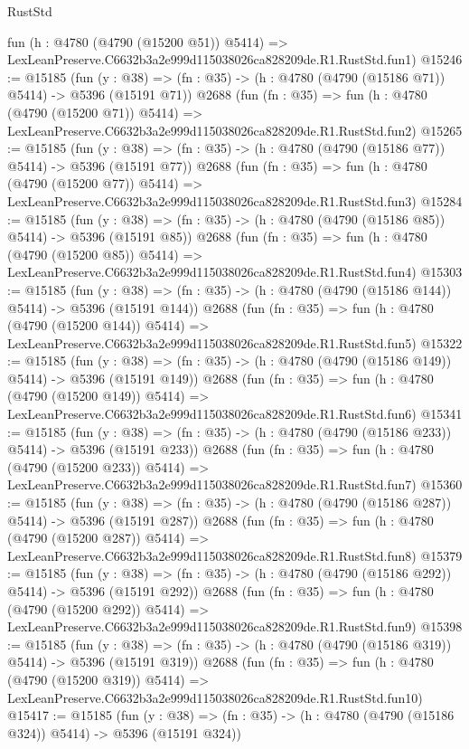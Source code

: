 \begin{lexlean}{RustStd}
\begin{coremodule}
    fun (h : @4780 (@4790 (@15200 @51)) @5414) =>
    LexLeanPreserve.C6632b3a2e999d115038026ca828209de.R1.RustStd.fun1)
@15246 := @15185
    (fun (y : @38) => (fn : @35) -> (h : @4780 (@4790 (@15186 @71)) @5414) -> @5396 (@15191 @71))
    @2688
    (fun (fn : @35) =>
    fun (h : @4780 (@4790 (@15200 @71)) @5414) =>
    LexLeanPreserve.C6632b3a2e999d115038026ca828209de.R1.RustStd.fun2)
@15265 := @15185
    (fun (y : @38) => (fn : @35) -> (h : @4780 (@4790 (@15186 @77)) @5414) -> @5396 (@15191 @77))
    @2688
    (fun (fn : @35) =>
    fun (h : @4780 (@4790 (@15200 @77)) @5414) =>
    LexLeanPreserve.C6632b3a2e999d115038026ca828209de.R1.RustStd.fun3)
@15284 := @15185
    (fun (y : @38) => (fn : @35) -> (h : @4780 (@4790 (@15186 @85)) @5414) -> @5396 (@15191 @85))
    @2688
    (fun (fn : @35) =>
    fun (h : @4780 (@4790 (@15200 @85)) @5414) =>
    LexLeanPreserve.C6632b3a2e999d115038026ca828209de.R1.RustStd.fun4)
@15303 := @15185
    (fun (y : @38) => (fn : @35) -> (h : @4780 (@4790 (@15186 @144)) @5414) -> @5396 (@15191 @144))
    @2688
    (fun (fn : @35) =>
    fun (h : @4780 (@4790 (@15200 @144)) @5414) =>
    LexLeanPreserve.C6632b3a2e999d115038026ca828209de.R1.RustStd.fun5)
@15322 := @15185
    (fun (y : @38) => (fn : @35) -> (h : @4780 (@4790 (@15186 @149)) @5414) -> @5396 (@15191 @149))
    @2688
    (fun (fn : @35) =>
    fun (h : @4780 (@4790 (@15200 @149)) @5414) =>
    LexLeanPreserve.C6632b3a2e999d115038026ca828209de.R1.RustStd.fun6)
@15341 := @15185
    (fun (y : @38) => (fn : @35) -> (h : @4780 (@4790 (@15186 @233)) @5414) -> @5396 (@15191 @233))
    @2688
    (fun (fn : @35) =>
    fun (h : @4780 (@4790 (@15200 @233)) @5414) =>
    LexLeanPreserve.C6632b3a2e999d115038026ca828209de.R1.RustStd.fun7)
@15360 := @15185
    (fun (y : @38) => (fn : @35) -> (h : @4780 (@4790 (@15186 @287)) @5414) -> @5396 (@15191 @287))
    @2688
    (fun (fn : @35) =>
    fun (h : @4780 (@4790 (@15200 @287)) @5414) =>
    LexLeanPreserve.C6632b3a2e999d115038026ca828209de.R1.RustStd.fun8)
@15379 := @15185
    (fun (y : @38) => (fn : @35) -> (h : @4780 (@4790 (@15186 @292)) @5414) -> @5396 (@15191 @292))
    @2688
    (fun (fn : @35) =>
    fun (h : @4780 (@4790 (@15200 @292)) @5414) =>
    LexLeanPreserve.C6632b3a2e999d115038026ca828209de.R1.RustStd.fun9)
@15398 := @15185
    (fun (y : @38) => (fn : @35) -> (h : @4780 (@4790 (@15186 @319)) @5414) -> @5396 (@15191 @319))
    @2688
    (fun (fn : @35) =>
    fun (h : @4780 (@4790 (@15200 @319)) @5414) =>
    LexLeanPreserve.C6632b3a2e999d115038026ca828209de.R1.RustStd.fun10)
@15417 := @15185
    (fun (y : @38) => (fn : @35) -> (h : @4780 (@4790 (@15186 @324)) @5414) -> @5396 (@15191 @324))

\end{coremodule}
\end{lexlean}

